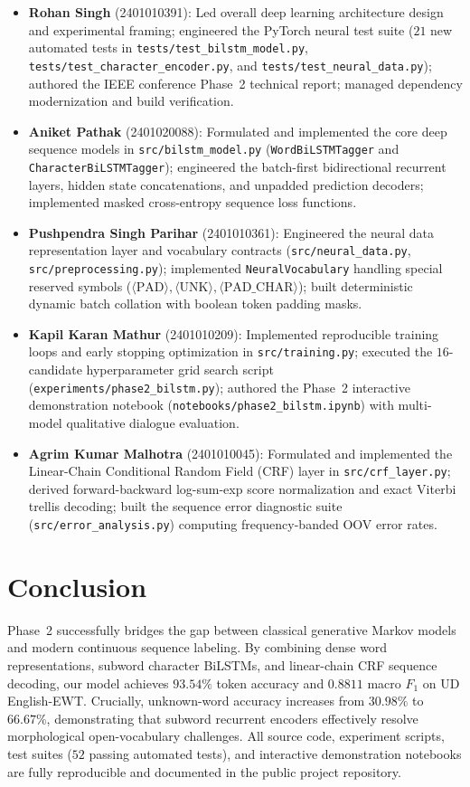 \documentclass[conference]{IEEEtran}
\begin{document}
\begin{itemize}
    \item \textbf{Rohan Singh} (2401010391): Led overall deep learning architecture design and experimental framing; engineered the PyTorch neural test suite ($21$ new automated tests in \texttt{tests/test\_bilstm\_model.py}, \texttt{tests/test\_character\_encoder.py}, and \texttt{tests/test\_neural\_data.py}); authored the IEEE conference Phase~2 technical report; managed dependency modernization and build verification.
    \item \textbf{Aniket Pathak} (2401020088): Formulated and implemented the core deep sequence models in \texttt{src/bilstm\_model.py} (\texttt{WordBiLSTMTagger} and \texttt{CharacterBiLSTMTagger}); engineered the batch-first bidirectional recurrent layers, hidden state concatenations, and unpadded prediction decoders; implemented masked cross-entropy sequence loss functions.
    \item \textbf{Pushpendra Singh Parihar} (2401010361): Engineered the neural data representation layer and vocabulary contracts (\texttt{src/neural\_data.py}, \texttt{src/preprocessing.py}); implemented \texttt{NeuralVocabulary} handling special reserved symbols ($\langle\text{PAD}\rangle, \langle\text{UNK}\rangle, \langle\text{PAD\_CHAR}\rangle$); built deterministic dynamic batch collation with boolean token padding masks.
    \item \textbf{Kapil Karan Mathur} (2401010209): Implemented reproducible training loops and early stopping optimization in \texttt{src/training.py}; executed the $16$-candidate hyperparameter grid search script (\texttt{experiments/phase2\_bilstm.py}); authored the Phase~2 interactive demonstration notebook (\texttt{notebooks/phase2\_bilstm.ipynb}) with multi-model qualitative dialogue evaluation.
    \item \textbf{Agrim Kumar Malhotra} (2401010045): Formulated and implemented the Linear-Chain Conditional Random Field (CRF) layer in \texttt{src/crf\_layer.py}; derived forward-backward log-sum-exp score normalization and exact Viterbi trellis decoding; built the sequence error diagnostic suite (\texttt{src/error\_analysis.py}) computing frequency-banded OOV error rates.
\end{itemize}

\section{Conclusion}
Phase~2 successfully bridges the gap between classical generative Markov models and modern continuous sequence labeling. By combining dense word representations, subword character BiLSTMs, and linear-chain CRF sequence decoding, our model achieves $93.54\%$ token accuracy and $0.8811$ macro $F_1$ on UD English-EWT. Crucially, unknown-word accuracy increases from $30.98\%$ to $66.67\%$, demonstrating that subword recurrent encoders effectively resolve morphological open-vocabulary challenges. All source code, experiment scripts, test suites ($52$ passing automated tests), and interactive demonstration notebooks are fully reproducible and documented in the public project repository.
\end{document}
